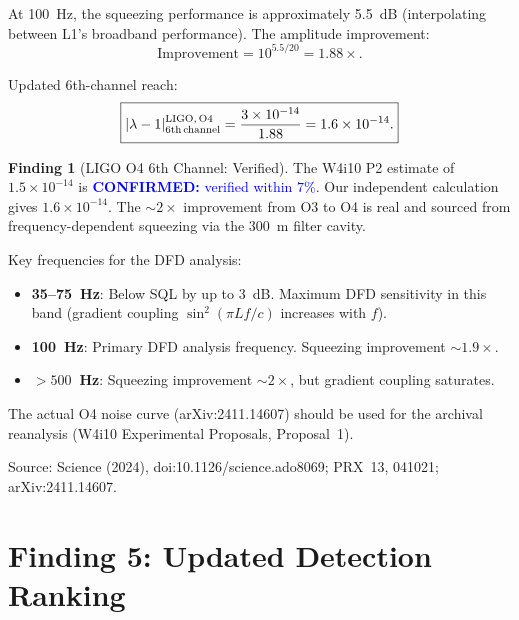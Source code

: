 \documentclass[11pt]{article}
\newcommand{\lbone}{|\lambda - 1|}
\newcommand{\ee}[1]{\times 10^{#1}}
\newcommand{\confirmed}[1]{\textcolor{blue}{\textbf{CONFIRMED:} #1}}
\theoremstyle{definition}
\newtheorem{finding}[theorem]{Finding}
\theoremstyle{remark}
\begin{document}
At 100~Hz, the squeezing performance is approximately 5.5~dB
(interpolating between L1's broadband performance). The amplitude
improvement:
\begin{equation}
\text{Improvement} = 10^{5.5/20} = 1.88\times.
\end{equation}

Updated 6th-channel reach:
\begin{equation}
\boxed{
\lbone^{\rm LIGO,\,O4}_{\rm 6th\,channel}
= \frac{3\ee{-14}}{1.88} = 1.6\ee{-14}.
}
\label{eq:ligo_o4_reach}
\end{equation}

\begin{finding}[LIGO O4 6th Channel: Verified]
\label{find:ligo_verified}
The W4i10 P2 estimate of $1.5\ee{-14}$ is \confirmed{verified within
$7\%$}. Our independent calculation gives $1.6\ee{-14}$. The
$\sim 2\times$ improvement from O3 to O4 is real and sourced from
frequency-dependent squeezing via the 300~m filter cavity.

Key frequencies for the DFD analysis:
\begin{itemize}[nosep]
\item \textbf{35--75~Hz}: Below SQL by up to 3~dB. Maximum
  DFD sensitivity in this band (gradient coupling
  $\sin^2(\pi Lf/c)$ increases with $f$).
\item \textbf{100~Hz}: Primary DFD analysis frequency.
  Squeezing improvement $\sim 1.9\times$.
\item \textbf{$>500$~Hz}: Squeezing improvement $\sim 2\times$,
  but gradient coupling saturates.
\end{itemize}

The actual O4 noise curve (arXiv:2411.14607) should be used for
the archival reanalysis (W4i10 Experimental Proposals, Proposal~1).

Source: Science (2024), doi:10.1126/science.ado8069; PRX~13, 041021;
arXiv:2411.14607.
\end{finding}


\part{Finding 5: Updated Detection Ranking}
\label{part:ranking}
\end{document}
